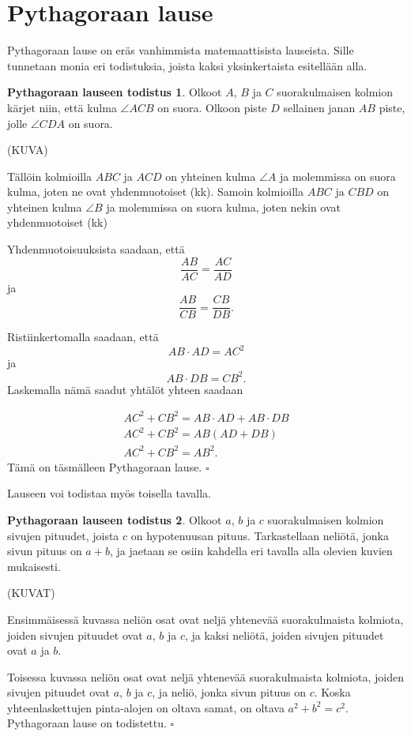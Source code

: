 \section*{Pythagoraan lause}

Pythagoraan lause on eräs vanhimmista matemaattisista lauseista. Sille tunnetaan monia eri
todistuksia, joista kaksi yksinkertaista esitellään alla.


\textbf{Pythagoraan lauseen todistus 1}. Olkoot $A$, $B$ ja $C$ suorakulmaisen kolmion
kärjet niin, että kulma $\angle ACB$ on suora. Olkoon piste $D$ sellainen janan $AB$ piste,
jolle $\angle CDA$ on suora.

(KUVA)

Tällöin kolmioilla $ABC$ ja $ACD$ on yhteinen kulma $\angle A$ ja molemmissa on suora kulma, joten ne ovat yhdenmuotoiset (kk). Samoin kolmioilla $ABC$ ja $CBD$ on yhteinen kulma
$\angle B$ ja molemmissa on suora kulma, joten nekin ovat yhdenmuotoiset (kk)

Yhdenmuotoisuuksista saadaan, että
\[
\frac{AB}{AC} = \frac{AC}{AD}
\]
ja
\[
\frac{AB}{CB} = \frac{CB}{DB}.
\]

Ristiinkertomalla saadaan, että
\[
AB \cdot AD = AC^2
\]
ja
\[
AB \cdot DB = CB^2.
\]
Laskemalla nämä saadut yhtälöt yhteen saadaan

\begin{align*}
AC^2 + CB^2  = AB \cdot AD + AB \cdot DB \\
AC^2 + CB^2  = AB(AD + DB) \\
AC^2 + CB^2  = AB^2.
\end{align*}
Tämä on täsmälleen Pythagoraan lause. $\square $

Lauseen voi todistaa myös toisella tavalla.

\textbf{Pythagoraan lauseen todistus 2}. Olkoot $a$, $b$ ja $c$ suorakulmaisen kolmion
sivujen pituudet, joista $c$ on hypotenuusan pituus. Tarkastellaan neliötä, jonka sivun
pituus on $a+b$, ja jaetaan se osiin kahdella eri tavalla alla olevien kuvien mukaisesti.

(KUVAT)

Ensimmäisessä kuvassa neliön osat ovat neljä yhtenevää suorakulmaista kolmiota, joiden
sivujen pituudet ovat $a$, $b$ ja $c$, ja kaksi neliötä, joiden sivujen pituudet ovat $a$ ja
$b$.

Toisessa kuvassa neliön osat ovat neljä yhtenevää suorakulmaista kolmiota, joiden
sivujen pituudet ovat $a$, $b$ ja $c$, ja neliö, jonka sivun pituus on $c$.
Koska yhteenlaskettujen pinta-alojen on oltava samat, on oltava $a^2 + b^2 = c^2$.
Pythagoraan lause on todistettu. $\square $